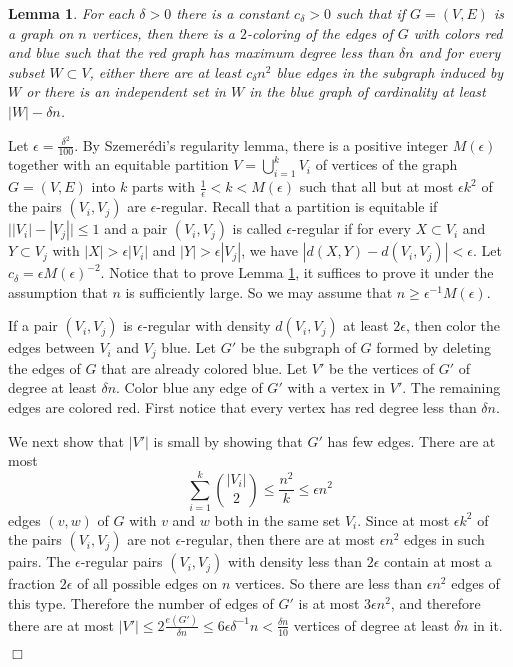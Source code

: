 \documentclass[11pt]{article}
\newenvironment{proof}
      {\medskip\noindent{\bf Proof.}\hspace{1mm}}
      {\hfill$\Box$\medskip}
\newtheorem{lemma}[theorem]{Lemma}
\begin{document}
\begin{lemma}\label{twocoloring} For each $\delta>0$ there is a constant $c_{\delta}>0$ such that if $G=(V,E)$ is a graph
on $n$ vertices, then there is a $2$-coloring of the edges of $G$
with colors red and blue such that the red graph has maximum degree
less than $\delta n$ and for every subset $W \subset V$, either there are
at least $c_{\delta}n^2$ blue edges in the subgraph induced by $W$
or there is an independent set in $W$ in the blue graph of
cardinality at least $|W|-\delta n$.
\end{lemma}
\begin{proof} Let $\epsilon=\frac{\delta^2}{100}$. By Szemer\'edi's
regularity lemma, there is a positive integer $M(\epsilon)$ together with
an equitable partition $V=\bigcup_{i=1}^k V_i$ of vertices of the graph $G=(V,E)$ into $k$ parts with
$\frac{1}{\epsilon}<k<M(\epsilon)$ such that all but at most $\epsilon
k^2$ of the pairs $(V_i,V_j)$ are $\epsilon$-regular. Recall that a partition is equitable if
$\big||V_i|-|V_j|\big| \leq 1$ and
a pair $(V_i,V_j)$ is called $\epsilon$-regular if for every $X \subset V_i$ and $Y
\subset V_j$ with $|X| > \epsilon |V_i|$ and $|Y| > \epsilon |V_j|$, we
have $|d(X,Y)-d(V_i,V_j)|<\epsilon$.
Let $c_{\delta}=\epsilon M(\epsilon)^{-2}$. Notice that to prove Lemma
\ref{twocoloring}, it suffices to prove it under the assumption that
$n $ is sufficiently large. So we may assume that $n \geq
\epsilon^{-1}M(\epsilon)$.

If a pair $(V_i,V_j)$ is $\epsilon$-regular with density
$d(V_i,V_j)$ at least $2\epsilon$, then color the edges between
$V_i$ and $V_j$ blue. Let $G'$ be the subgraph of $G$ formed by
deleting the edges of $G$ that are already colored blue. Let $V'$ be
the vertices of $G'$ of degree at least $\delta n$. Color blue any
edge of $G'$ with a vertex in $V'$. The remaining edges are colored
red. First notice that every vertex has red degree less than $\delta
n$.

We next show that $|V'|$ is small by showing that $G'$ has few
edges. There are at most
$$\sum_{i=1}^k {|V_i| \choose 2} \leq \frac{n^2}{k} \leq
\epsilon n^2$$ edges $(v,w)$ of $G$ with $v$ and $w$ both in the
same set $V_i$. Since at most $\epsilon k^2$ of the pairs
$(V_i,V_j)$ are not $\epsilon$-regular, then there are at most
$\epsilon n^2$ edges in such pairs. The $\epsilon$-regular pairs
$(V_i,V_j)$ with density less than $2\epsilon$ contain at most a
fraction $2\epsilon$ of all possible edges on $n$ vertices. So there
are less than $\epsilon n^2$ edges of this type. Therefore the
number of edges of $G'$ is at most $3\epsilon n^2$, and therefore
there are at most $|V'| \leq 2\frac{e(G')}{\delta n} \leq 6\epsilon
\delta^{-1}n<\frac{\delta n}{10}$ vertices of degree at least
$\delta n$ in it.


\end{proof}
\end{document}
